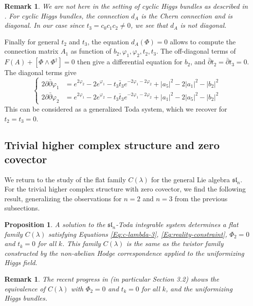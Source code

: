 \documentclass[11pt]{amsart}
\newtheorem{prop}[thm]{Proposition}
\newtheorem{Remark}[thm]{Remark}
\numberwithin{thm}{section} %
\numberwithin{equation}{section} %
\numberwithin{figure}{section} %
\renewcommand*{\l}{\lambda}
\begin{document}
\begin{Remark}
    We are not here in the setting of cyclic Higgs bundles as described in \cite{Baraglia}. For cyclic Higgs bundles, the connection $d_A$ is the Chern connection and is diagonal. In our case since $t_3=c_0c_1c_2\neq 0$, we see that $d_A$ is not diagonal.
\end{Remark}

Finally for general $t_2$ and $t_3$, the equation $d_A(\Phi)=0$ allows to compute the connection matrix $A_1$ as function of $b_2, \varphi_1, \varphi_2, t_2, t_3$. The off-diagonal terms of $F(A)+[\Phi\wedge\Phi^\dagger]=0$ then give a differential equation for $b_2$, and $\bar\partial t_2=\bar\partial t_3=0$. The diagonal terms give
$$ \left \{\begin{array}{cl}
2\partial\bar{\partial}\varphi_1 &= e^{2\varphi_2}-2e^{\varphi_1}-t_3\bar{t}_3e^{-2\varphi_1-2\varphi_2}+\lvert a_5\rvert^2-2\lvert a_1\rvert^2-\lvert b_2\rvert^2 \\
2\partial\bar{\partial}\varphi_2 &= e^{2\varphi_1}-2e^{\varphi_2}-t_3\bar{t}_3e^{-2\varphi_1-2\varphi_2}+\lvert a_1\rvert^2-2\lvert a_5\rvert^2-\lvert b_2\rvert^2
\end{array}\right. $$
This can be considered as a generalized Toda system, which we recover for $t_2=t_3=0$.


\subsection{Trivial higher complex structure and zero covector}\label{flatconnectionlambda}

We return to the study of the flat family $C(\l)$ for the general Lie algebra $\mathfrak{sl}_n$. For the trivial higher complex structure with zero covector, we find the following result, generalizing the observations for $n=2$ and $n=3$ from the previous subsections.

\begin{prop}\label{linktohiggs}
A solution to the $\mathfrak{sl}_n$-Toda integrable system determines a flat family $C(\l)$ satisfying Equations \eqref{Eq:c-lambda-3}, \eqref{Eq:reality-constraint}, $\Phi_2=0$ and $t_k=0$ for all $k$. This family $C(\l)$ is the same as the twistor family constructed by the non-abelian Hodge correspondence applied to the uniformizing Higgs field.
\end{prop}

\begin{Remark}
The recent progress in \cite{Fock-bundles} (in particular Section 3.2) shows the equivalence of $C(\l)$ with $\Phi_2=0$ and $t_k=0$ for all $k$, and the uniformizing Higgs bundles.
\end{Remark}
\end{document}
